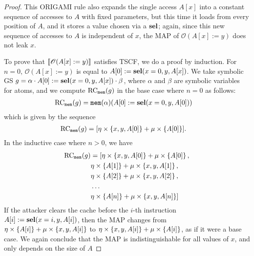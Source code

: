 \begin{proof}
    This ORIGAMI rule also expands the single access $A[x]$ into a constant sequence of accesses to $A$ with fixed parameters, but this time it loads from every position of $A$, and it stores a value chosen via a $\textbf{sel}$; again, since this new sequence of accesses to $A$ is independent of $x$, the MAP of $\mathscr{O}(A[x]:=y)$ does not leak $x$. 

    To prove that $\llbracket \mathscr{O}(A[x]:=y)\rrbracket$ satisfies TSCF, we do a proof by induction.
    For $n=0$, $\mathscr{O}(A[x]:=y)$ is equal to $A[0]:=\textbf{sel}(x=0,y,A[x])$. We take symbolic GS $g=\alpha\cdot A[0]:=\textbf{sel}(x=0,y,A[x])\cdot \beta$, where $\alpha$ and $\beta$ are symbolic variables for atoms, and we compute $\text{RC}_{\texttt{mem}}(g)$ in the base case where $n=0$ as follows:
    \begin{align*}
        \text{RC}_{\texttt{mem}}(g)
        &=\texttt{mem}(\alpha)(A[0]:=\textbf{sel}(x=0,y,A[0]))
    \end{align*}
which is given by the sequence
    \begin{align*}
        \text{RC}_{\texttt{mem}}(g)&=[\eta\times\left\{x,y,A[0]\right\}+\mu\times \left\{A[0]\right\}].
    \end{align*}
In the inductive case where $n>0$, we have
    \begin{align*}
        \text{RC}_{\texttt{mem}}(g)&=[\eta\times\left\{x,y,A[0]\right\}+\mu\times \left\{A[0]\right\},\\
        &\eta\times\left\{A[1]\right\}+\mu\times \left\{x,y,A[1]\right\},\\
        &\eta\times\left\{A[2]\right\}+\mu\times \left\{x,y,A[2]\right\},\\
        &\ldots\\
        &\eta\times\left\{A[n]\right\}+\mu\times \left\{x,y,A[n]\right\}]
    \end{align*}
If the attacker clears the cache before the $i$-th instruction $A[i]:=\textbf{sel}(x=i,y,A[i])$, then the MAP changes from $\eta\times\left\{A[i]\right\}+\mu\times \left\{x,y,A[i]\right\}$ to $\eta\times\left\{x,y,A[i]\right\}+\mu\times \left\{A[i]\right\}$, as if it were a base case. We again conclude that the MAP is indistinguishable for all values of $x$, and only depends on the size of $A$
%     
    
\end{proof}
